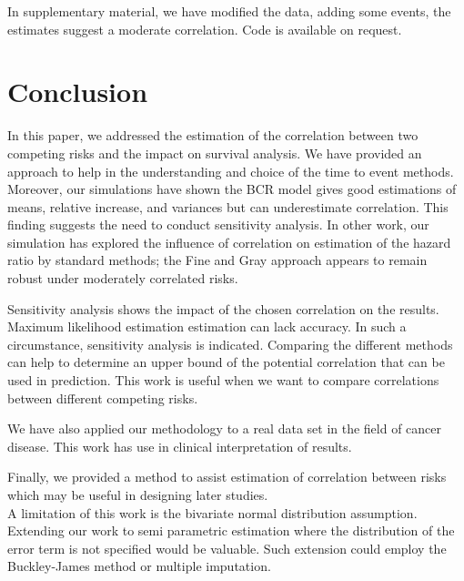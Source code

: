 \documentclass[twoside,a4paper,12pt]{article}
\theoremstyle{plain}
\theoremstyle{definition}
\begin{document}
In supplementary material, we have modified the data, adding some events, the 
estimates suggest a moderate correlation.
Code is available on request.

\section{Conclusion}
\label{summary}
In this paper, we addressed the estimation of the correlation between two 
competing risks and the impact on survival analysis. 
We have provided an approach to help in the understanding and choice of the time 
to event methods. 
Moreover, our simulations have shown the BCR model gives good estimations of 
means, {relative increase}, and variances but can underestimate  correlation. 
This finding suggests the need to conduct sensitivity analysis. 
In other work, our simulation has explored the influence of correlation  on 
estimation of the hazard ratio by standard methods; 
the Fine and Gray approach appears to remain robust under moderately correlated risks. 

Sensitivity analysis shows the impact of the chosen correlation on the results. 
Maximum 
likelihood estimation estimation can lack accuracy.
In such a circumstance, sensitivity analysis is indicated. 
Comparing the different methods can help to determine an upper bound of the 
potential correlation that can be used in prediction. This work is useful when 
we want to compare correlations between different competing risks. 

We have also applied our methodology to a real data set in the field of cancer 
disease. This work has use in clinical interpretation of results.

Finally, we provided 
a method to assist estimation of correlation between risks which may be useful 
in designing later studies.\\

A limitation of this work is the bivariate normal distribution assumption. 
Extending our work to semi parametric estimation where the distribution of the 
error term is not specified would be valuable. 
Such extension could employ the Buckley-James method or multiple imputation.\\
   
\end{document}
